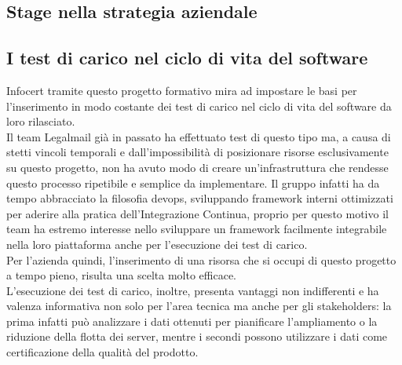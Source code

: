\subsection{Stage nella strategia aziendale}
\subsection{I test di carico nel ciclo di vita del software}
Infocert tramite questo progetto formativo mira ad impostare le basi per l'inserimento in modo costante dei test di carico nel ciclo di vita del software da loro rilasciato. \\
Il team Legalmail già in passato ha effettuato test di questo tipo ma, a causa di stetti vincoli temporali e dall'impossibilità di posizionare risorse esclusivamente su questo progetto, non ha avuto modo di creare un'infrastruttura che rendesse questo processo ripetibile e semplice da implementare.  
Il gruppo infatti ha da tempo abbracciato la filosofia \gls{devops}, sviluppando \gls{framework} interni ottimizzati per aderire alla pratica dell'Integrazione Continua, proprio per questo motivo il team ha estremo interesse nello sviluppare un framework facilmente integrabile nella loro piattaforma anche per l'esecuzione dei test di carico. \\
Per l'azienda quindi, l'inserimento di una risorsa che si occupi di questo progetto a tempo pieno, risulta una scelta molto efficace. \\
L'esecuzione dei test di carico, inoltre, presenta vantaggi non indifferenti e ha valenza informativa non solo per l'area tecnica ma anche per gli \gls{stakeholders}: la prima infatti può analizzare i dati ottenuti per pianificare l'ampliamento o la riduzione della flotta dei server, mentre i secondi possono utilizzare i dati come certificazione della qualità del prodotto.